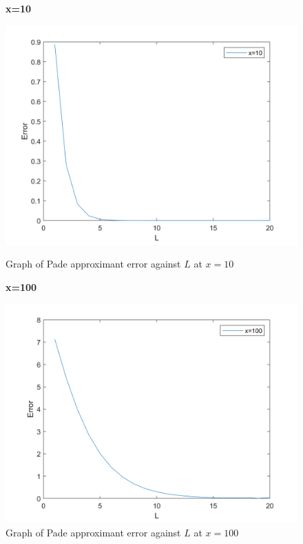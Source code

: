 \documentclass[10pt]{article}
\begin{document}
\begin{figure}[H]
    \begin{minipage}[b]{0.47\linewidth}
            \centering
            \textbf{x=10}\par
            \includegraphics[width=\textwidth]{Files/q3_pp_10.png}
            \caption{Graph of Pade approximant error against $L$ at $x=10$}
        \end{minipage}
        \hfill
    \begin{minipage}[b]{0.47\linewidth}
            \centering
            \textbf{x=100}\par
            \includegraphics[width=\textwidth]{Files/q3_pp_100.png}
            \caption{Graph of Pade approximant error against $L$ at $x=100$}
        \end{minipage}
\end{figure}
\end{document}
